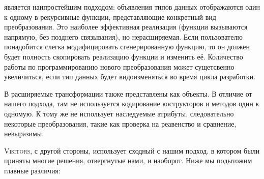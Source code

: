  является наипростейшим подходом: объявления типов данных отображаются один к одному в рекурсивные функции, представляющие конкретный вид преобразования. Это наиболее эффективная реализация (функции вызываются напрямую, без позднего связывания), но нерасширяемая. Если пользователю понадобится слегка модифицировать сгенерированную функцию, то он должен будет полность скопировать реализацию функции и изменить её. Количество работы по программированию нового преобразования может сущетсвенно увеличиться, если тип данных будет видоизменяться во время цикла разработки.

В  расширяемые трансформации также представлены как объекты. В отличие от нашего подхода, там не используется кодирование кострукторов и методов один к одномую. К тому же  не использует наследуемые атрибуты, следовательно некоторые преобразования, такие как проверка на реавенство и сравнение, невыразимы. 

\textsc{Visitors}, с другой стороны, использует сходный с нашим подход. в котором были приняты многие решения, отвергнутые нами, и наоборот.
Ниже мы подытожим главные различия:

